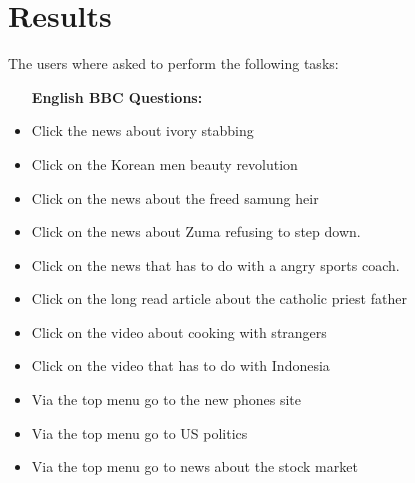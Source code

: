 \section{Results}
The users where asked to perform the following tasks:
\begin{itemize}
	\item [\textbf{English BBC Questions:}]
	\item Click the news about ivory stabbing
	
	\item Click on the Korean men beauty revolution
	
	\item Click on the news about the freed samung heir
	
	\item Click on the news about Zuma refusing to step down.
	
	\item Click on the news that has to do with a angry sports coach.
	
	\item Click on the long read article about the catholic priest father
	
	\item Click on the video about cooking with strangers
	
	\item Click on the video that has to do with Indonesia

	\item Via the top menu go to the new phones site
	
	\item Via the top menu go to US politics
	
	\item Via the top menu go to news about the stock market
	
\end{itemize}

